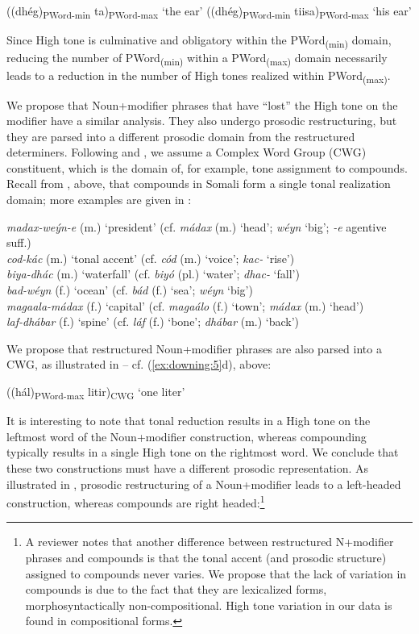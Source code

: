 \documentclass[output=paper]{langscibook}
\begin{document}
\ea \label{ex:downing:19}
\ea ((dhég)\textsubscript{PWord-min} ta)\textsubscript{PWord-max}   ‘the ear’ \label{ex:downing:19a}
\ex ((dhég)\textsubscript{PWord-min} tiisa)\textsubscript{PWord-max}   ‘his ear’ \label{ex:downing:19b}
\z
\z

Since High tone is culminative and obligatory within the PWord\textsubscript{(min)} domain, reducing the number of PWord\textsubscript{(min)} within a PWord\textsubscript{(max)} domain necessarily leads to a reduction in the number of High tones realized within PWord\textsubscript{(max)}.

We propose that Noun+modifier phrases that have ``lost'' the High tone on the modifier have a similar analysis. They also undergo prosodic restructuring, but they are parsed into a different prosodic domain from the restructured determiners. Following \citet{Vigário2010} and \citet{vogel2010phonology}, we assume a Complex Word Group (CWG) constituent, which is the domain of, for example, tone assignment to compounds. Recall from , above, that compounds in Somali form a single tonal realization domain; more examples are given in :

\ea \label{ex:downing:20}
\ea  \textit{madax-weýn-e} (m.) ‘president’ (cf. \textit{mádax} (m.) ‘head’; \textit{wéyn} ‘big’; \textit{{}-e} agentive suff.)\\
\ex   \textit{cod-kác} (m.) ‘tonal accent’ (cf. \textit{cód} (m.) ‘voice’; \textit{kac-} ‘rise’)\\
\ex   \textit{biya-dhác} (m.) ‘waterfall’ (cf. \textit{biyó} (pl.) ‘water’; \textit{dhac-} ‘fall’)\\
\ex   \textit{bad-wéyn} (f.) ‘ocean’ (cf. \textit{bád} (f.) ‘sea’; \textit{wéyn} ‘big’)\\
\ex   \textit{magaala-mádax} (f.) ‘capital’ (cf. \textit{magaálo} (f.) ‘town’; \textit{mádax} (m.) ‘head’)\\
\ex   \textit{laf-dhábar} (f.) ‘spine’ (cf. \textit{láf} (f.) `bone'; \textit{dhábar} (m.) ‘back’) \\
\z
\z

We propose that restructured Noun+modifier phrases are also parsed into a CWG, as illustrated in  – cf. (\ref{ex:downing:5}d), above:

\ea  ((hál)\textsubscript{PWord-max} litir)\textsubscript{CWG} ‘one liter’ \label{ex:downing:21}
\z

It is interesting to note that tonal reduction results in a High tone on the leftmost word of the Noun+modifier construction, whereas compounding typically results in a single High tone on the rightmost word. We conclude that these two constructions must have a different prosodic representation. As illustrated in , prosodic restructuring of a Noun+modifier leads to a left-headed construction, whereas compounds are right headed:\footnote{A reviewer notes that another difference between restructured N+modifier phrases and compounds is that the tonal accent (and prosodic structure) assigned to compounds never varies. We propose that the lack of variation in compounds is due to the fact that they are lexicalized forms, morphosyntactically non-compositional. High tone variation in our data is found in compositional forms.}
\end{document}
